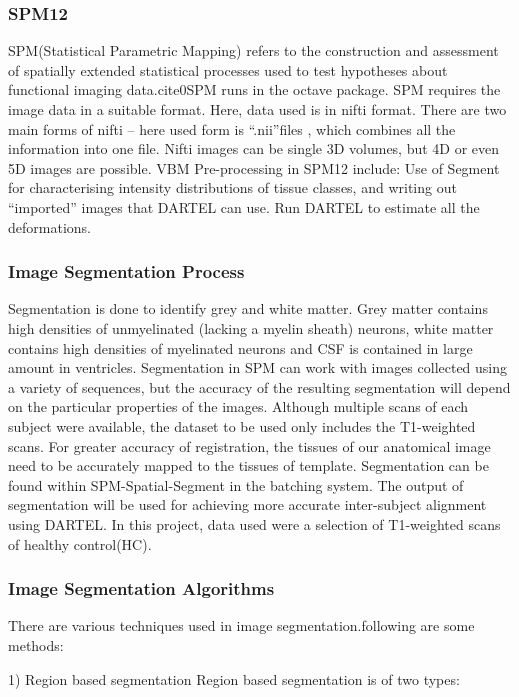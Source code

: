 \documentclass{article}
\begin{document}
\subsubsection{SPM12}

SPM(Statistical Parametric Mapping) refers to the
construction and assessment of spatially extended statistical
processes used to test hypotheses about functional imaging
data.{cite0}SPM runs in the octave package. SPM requires the image
data in a suitable format. Here, data used is in nifti format. There
are two main forms of nifti – here used form is ``.nii''files , which
combines all the information into one file. Nifti images can be
single 3D volumes, but 4D or even 5D images are possible. VBM
Pre-processing in SPM12 include: Use of Segment for characterising
intensity distributions of tissue classes, and writing out
``imported'' images that DARTEL can use. Run DARTEL to estimate all
the deformations.

\subsubsection{Image Segmentation Process}

Segmentation is done to identify grey and white matter. Grey matter
contains high densities of unmyelinated (lacking a myelin sheath)
neurons, white matter contains high densities of myelinated neurons
and CSF is contained in large amount in ventricles. Segmentation in
SPM can work with images collected using a variety of sequences, but
the accuracy of the resulting segmentation will depend on the
particular properties of the images. Although multiple scans of each
subject were available, the dataset to be used only includes the
T1-weighted scans. For greater accuracy of registration, the tissues
of our anatomical image need to be accurately mapped to the tissues of
template. Segmentation can be found within SPM-Spatial-Segment in the
batching system. The output of segmentation will be used for achieving
more accurate inter-subject alignment using DARTEL. In this project,
data used were a selection of T1-weighted scans of healthy
control(HC).

\subsubsection{Image Segmentation Algorithms}

There are various techniques used in image segmentation.following are
some methods:

1) Region based segmentation Region based segmentation
is of two types:
\end{document}
